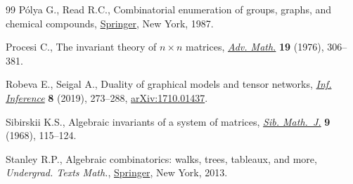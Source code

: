 \documentclass[pdftex]{sigma}
\numberwithin{equation}{section}
\begin{document}
\begin{thebibliography}{99}
P\'olya G., Read R.C., Combinatorial enumeration of groups, graphs, and
  chemical compounds, \href{https://doi.org/10.1007/978-1-4612-4664-0}{Springer}, New York, 1987.

Procesi C., The invariant theory of {$n\times n$} matrices, \href{https://doi.org/10.1016/0001-8708(76)90027-X}{\textit{Adv. Math.}}
  \textbf{19} (1976), 306--381.

Robeva E., Seigal A., Duality of graphical models and tensor networks,
  \href{https://doi.org/10.1093/imaiai/iay009}{\textit{Inf. Inference}} \textbf{8} (2019), 273--288, \href{https://arxiv.org/abs/1710.01437}{arXiv:1710.01437}.

Sibirskii K.S., Algebraic invariants of a system of matrices, \href{https://doi.org/10.1007/BF02196663}{\textit{Sib.
  Math.~J.}} \textbf{9} (1968), 115--124.

Stanley R.P., Algebraic combinatorics: walks, trees, tableaux, and more,
  \textit{Undergrad. Texts Math.}, \href{https://doi.org/10.1007/978-1-4614-6998-8}{Springer}, New York, 2013.

\end{thebibliography}\LastPageEnding

 
\end{document}
